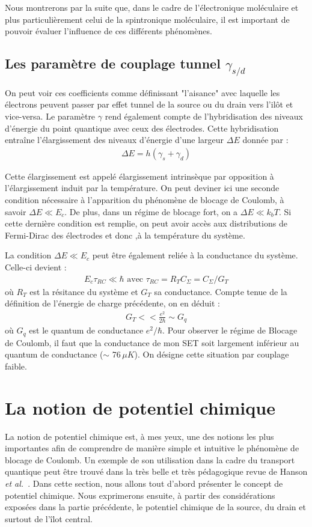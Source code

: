 Nous montrerons par la suite que, dans le cadre de l'électronique moléculaire et plus particulièrement celui de la spintronique moléculaire, il est important de pouvoir évaluer l'influence de ces différents phénomènes.

\subsection{Les paramètre de couplage tunnel $\gamma_{s/d}$}

On peut voir ces coefficients comme définissant "l'aisance" avec laquelle les électrons peuvent passer par effet tunnel de la source ou du drain vers l'il\^ot et vice-versa. Le paramètre $\gamma$ rend également compte de l'hybridisation des niveaux d'énergie du point quantique avec ceux des électrodes. Cette hybridisation entraîne l'élargissement des niveaux d'énergie d'une largeur $\Delta E$ donnée par :
\begin{eqnarray}
\Delta E = h (\gamma_s + \gamma_d)
\label{hybridgamma}
\end{eqnarray}

Cette élargissement est appelé élargissement intrinsèque par opposition à l'élargissement induit par la température. On peut deviner ici une seconde condition nécessaire à l'apparition du phénomène de blocage de Coulomb, à savoir $\Delta E \ll E_c$. De plus, dans un régime de blocage fort, on a $\Delta E \ll k_bT$. Si cette dernière condition est remplie, on peut avoir accès aux distributions de Fermi-Dirac des électrodes et donc ,à la température du système.

La condition $\Delta E \ll E_c$ peut \^etre également reliée à la conductance du système. Celle-ci devient :
\begin{eqnarray}
E_c \tau_{RC} \ll \hbar \text{  avec  } \tau_{RC}=R_TC_{\Sigma}=C_{\Sigma}/G_T \nonumber
\end{eqnarray}
où $R_T$ est la résitance du système et $G_T$ sa conductance. Compte tenue de la définition de l'énergie de charge précédente, on en déduit :
\begin{eqnarray}
G_T << \frac{e^2}{2\hbar} \sim G_q
\end{eqnarray}
où $G_q$ est le quantum de conductance $e^2/ \hbar$. Pour observer le régime de Blocage de Coulomb, il faut que la conductance de mon SET soit largement inférieur au quantum de conductance ($\sim$ 76\,$\mu K$). On désigne cette situation par couplage faible.


\section{La notion de potentiel chimique}
La notion de potentiel chimique est, à mes yeux, une des notions les plus importantes afin de comprendre de manière simple et intuitive le phénomène de blocage de Coulomb. Un exemple de son utilisation dans la cadre du transport quantique peut \^etre trouvé dans la très belle et très pédagogique revue de Hanson \textit{et al.}~\cite{Hanson2007}. Dans cette section, nous allons tout d'abord présenter le concept de potentiel chimique. Nous exprimerons ensuite, à partir des considérations exposées dans la partie précédente, le potentiel chimique de la source, du drain et surtout de l'\^ilot central.

